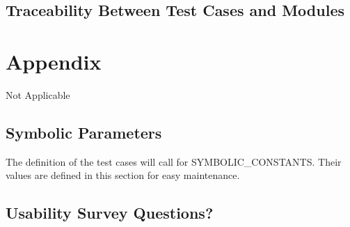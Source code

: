 \documentclass[12pt, titlepage]{article}
\begin{document}
		


					
					
					
					
					

					
					
					
					




\subsection{Traceability Between Test Cases and Modules}


				




\newpage

\section{Appendix}\label{sec_appendix}
 Not Applicable

\subsection{Symbolic Parameters}

The definition of the test cases will call for SYMBOLIC\_CONSTANTS.
Their values are defined in this section for easy maintenance.

\subsection{Usability Survey Questions?}


\newpage{}
\end{document}
